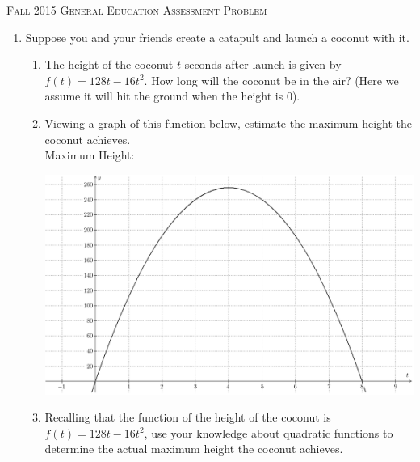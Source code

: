 \documentclass[12pt]{article}
\begin{document}
\thispagestyle{empty}


\textsc{Fall 2015 General Education Assessment Problem}\\
\begin{enumerate}
\item Suppose you and your friends create a catapult and launch a coconut with it.
\begin{enumerate}
\item The height of the coconut $t$ seconds after launch is given by $f(t)=128t-16t^2$. How long will the coconut be in the air? (Here we assume it will hit the ground when the height is $0$).
\vspace{1in}
\item Viewing a graph of this function below, estimate the maximum height the coconut achieves. \vspace{.25in}\\ 
Maximum Height: \\ \vspace{.25in}
\begin{center}
\includegraphics[scale=.5]{coconut.PNG}
\end{center}
\item Recalling that the function of the height of the coconut is $f(t)=128t-16t^2$, use your knowledge about quadratic functions to determine the actual maximum height the coconut achieves.
\end{enumerate}

\end{enumerate}
\end{document}
